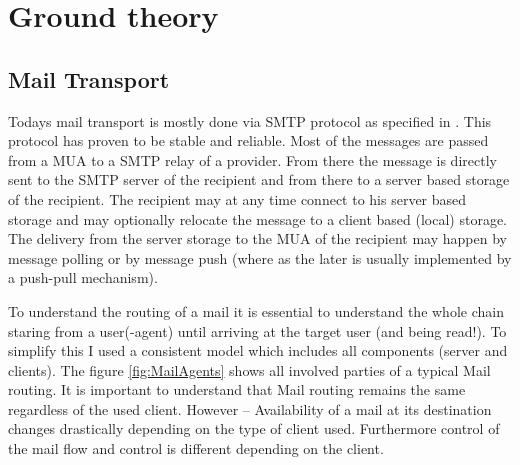 \chapter{Ground theory}
\section{Mail Transport}
Todays mail transport is mostly done via SMTP protocol as specified in \cite{RFC5321}. This protocol has proven to be stable and reliable. Most of the messages are passed from a MUA to a SMTP relay of a provider. From there the message is directly sent to the SMTP server of the recipient and from there to a server based storage of the recipient. The recipient may at any time connect to his server based storage and may optionally relocate the message to a client based (local) storage. The delivery from the server storage to the MUA of the recipient may happen by message polling or by message push (where as the later is usually implemented by a push-pull mechanism).\par

To understand the routing of a mail it is essential to understand the whole chain staring from a user(-agent) until arriving at the target user (and being read!). To simplify this I used a consistent model which includes all components (server and clients). The figure \ref{fig:MailAgents} shows all involved parties of a typical Mail routing. It is important to understand that Mail routing remains the same regardless of the used client. However -- Availability of a mail at its destination changes drastically depending on the type of client used. Furthermore control of the mail flow and control is different depending on the client.\par

